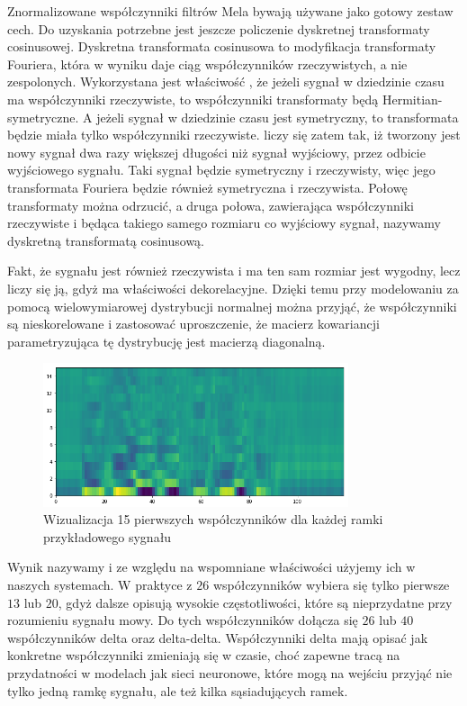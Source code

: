 Znormalizowane współczynniki filtrów Mela bywają używane jako gotowy zestaw cech. Do uzyskania 
potrzebne jest jeszcze policzenie dyskretnej transformaty cosinusowej. Dyskretna transformata cosinusowa to modyfikacja
transformaty Fouriera, która w wyniku daje ciąg współczynników rzeczywistych, a nie zespolonych. Wykorzystana jest
właściwość , że jeżeli sygnał w dziedzinie czasu ma współczynniki rzeczywiste, to współczynniki transformaty
będą Hermitian-symetryczne. A jeżeli sygnał w dziedzinie czasu jest symetryczny, to transformata będzie miała
tylko współczynniki rzeczywiste.  liczy się zatem tak, iż tworzony jest nowy sygnał dwa razy większej długości niż
sygnał wyjściowy, przez odbicie wyjściowego sygnału. Taki sygnał będzie symetryczny i rzeczywisty, więc jego transformata
Fouriera będzie również symetryczna i rzeczywista. Połowę transformaty można odrzucić, a druga połowa, zawierająca
współczynniki rzeczywiste i będąca takiego samego rozmiaru co wyjściowy sygnał, nazywamy dyskretną transformatą cosinusową.

Fakt, że  sygnału jest również rzeczywista i ma ten sam rozmiar jest wygodny, lecz liczy się ją, 
gdyż ma właściwości dekorelacyjne. Dzięki temu przy modelowaniu  za pomocą wielowymiarowej 
dystrybucji normalnej można przyjąć, że
współczynniki są nieskorelowane i zastosować uproszczenie, że macierz kowariancji parametryzująca tę dystrybucję 
jest macierzą diagonalną.

\begin{figure}[H]
    \centering
    \includegraphics[width=0.8\textwidth]{images/2_1_e_mfcc}
    \caption{Wizualizacja 15 pierwszych współczynników  dla każdej ramki przykładowego sygnału}
    \label{fig:2_1_e_mfcc}
\end{figure}

Wynik  nazywamy  i ze względu na wspomniane właściwości użyjemy ich
w naszych systemach. W praktyce z $26$ współczynników wybiera się tylko pierwsze $13$ lub $20$, gdyż dalsze opisują
wysokie częstotliwości, które są nieprzydatne przy rozumieniu sygnału mowy. Do tych współczynników dołącza się $26$ lub $40$
współczynników delta oraz delta-delta. Współczynniki delta mają opisać jak konkretne współczynniki zmieniają się w czasie,
choć zapewne tracą na przydatności w modelach jak sieci neuronowe, które mogą na wejściu przyjąć nie tylko jedną ramkę sygnału,
ale też kilka sąsiadujących ramek. 


